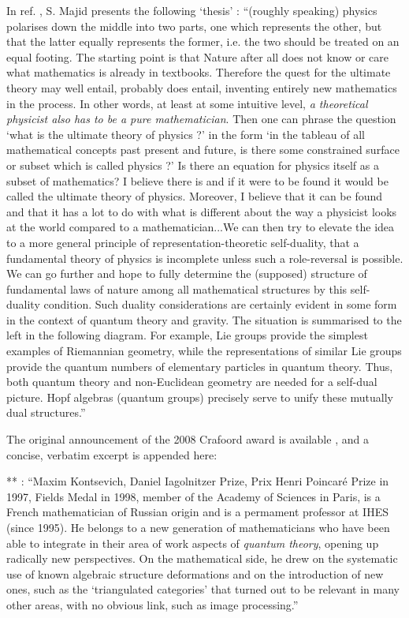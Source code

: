 \documentclass[12pt]{article}
\theoremstyle{plain}
\theoremstyle{definition}
\numberwithin{equation}{section}
\begin{document}
In ref. \cite{SM91}, S. Majid presents the following `thesis' : ``(roughly speaking) physics polarises down the middle into two parts, one which represents the other, but that the latter equally represents the former, i.e. the two should be treated on an equal footing. The starting point is that Nature after all does not know or care what mathematics is already in textbooks. Therefore the quest for the ultimate theory may well entail, probably does entail, inventing entirely new mathematics in the process. In other words, at least at some intuitive level, {\em a theoretical physicist also has to be a pure mathematician}. Then one can phrase the question `what is the ultimate theory of physics ?' in the form `in the tableau of all mathematical concepts past present and future, is there some constrained surface or subset which is called physics ?' Is there an equation for physics itself as a subset of mathematics? I believe there is and if it were to be found it would be called the ultimate theory of physics. Moreover, I believe that it can be found and that it has a lot to do with what is different about the way a physicist looks at the world compared to a mathematician...We can then try to elevate the idea to a more general principle of representation-theoretic self-duality, that a fundamental theory of physics is incomplete unless such a role-reversal is possible. We can go further and hope to fully determine the (supposed) structure of fundamental laws of nature among all mathematical structures by this self-duality condition. Such duality considerations are certainly evident in some form in the context of quantum theory and gravity. The situation is summarised to the left in the following diagram. For example, Lie groups provide the simplest examples of Riemannian geometry, while the representations of similar Lie groups provide the quantum numbers of elementary particles in quantum theory. Thus, both quantum theory and non-Euclidean geometry are needed for a self-dual picture. Hopf algebras (quantum groups) precisely serve to unify these mutually dual structures.''


The original announcement of the 2008 Crafoord award is available
,
and a concise, verbatim excerpt is appended here:

** :
``Maxim Kontsevich, Daniel Iagolnitzer Prize, Prix Henri Poincar\'e Prize in 1997, Fields Medal in 1998, member of the Academy of Sciences in Paris, is a French mathematician of Russian origin and is a permament professor at IHES (since 1995). He belongs to a new generation of mathematicians who have been able to integrate in their area of work aspects of \emph{quantum theory}, opening up radically new perspectives. On the mathematical side, he drew on the systematic use of known algebraic structure deformations and on the introduction of new ones, such as the `triangulated categories' that turned out to be relevant in many other areas, with no obvious link, such as image processing.''
\end{document}
